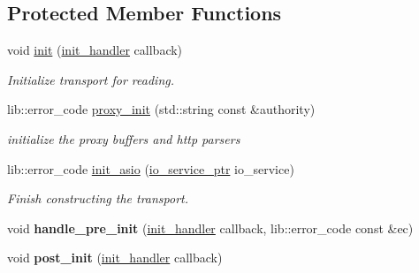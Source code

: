 \subsection*{Protected Member Functions}
\begin{DoxyCompactItemize}
\item 
void \mbox{\hyperlink{classwebsocketpp_1_1transport_1_1asio_1_1connection_ae09d85b808498f06bcc8d938c9107e8e}{init}} (\mbox{\hyperlink{namespacewebsocketpp_1_1transport_aeae75e675c1a334b3b33ab7120b480a5}{init\+\_\+handler}} callback)
\begin{DoxyCompactList}\small\item\em Initialize transport for reading. \end{DoxyCompactList}\item 
lib\+::error\+\_\+code \mbox{\hyperlink{classwebsocketpp_1_1transport_1_1asio_1_1connection_a2397c24d0ab9b344d70328788de721d4}{proxy\+\_\+init}} (std\+::string const \&authority)
\begin{DoxyCompactList}\small\item\em initialize the proxy buffers and http parsers \end{DoxyCompactList}\item 
lib\+::error\+\_\+code \mbox{\hyperlink{classwebsocketpp_1_1transport_1_1asio_1_1connection_a6432e2cbcb4e7781a6910dd7c9aa05e6}{init\+\_\+asio}} (\mbox{\hyperlink{classwebsocketpp_1_1transport_1_1asio_1_1connection_a8a0bff59326cab2996e414d32f627232}{io\+\_\+service\+\_\+ptr}} io\+\_\+service)
\begin{DoxyCompactList}\small\item\em Finish constructing the transport. \end{DoxyCompactList}\item 
\mbox{\label{classwebsocketpp_1_1transport_1_1asio_1_1connection_a27730f6446dd626f40b17ad1b26e5b77}} 
void {\bfseries handle\+\_\+pre\+\_\+init} (\mbox{\hyperlink{namespacewebsocketpp_1_1transport_aeae75e675c1a334b3b33ab7120b480a5}{init\+\_\+handler}} callback, lib\+::error\+\_\+code const \&ec)
\item 
\mbox{\label{classwebsocketpp_1_1transport_1_1asio_1_1connection_ad640e3f3123494ba1e58ad9842c46169}} 
void {\bfseries post\+\_\+init} (\mbox{\hyperlink{namespacewebsocketpp_1_1transport_aeae75e675c1a334b3b33ab7120b480a5}{init\+\_\+handler}} callback)

\end{DoxyCompactItemize}
